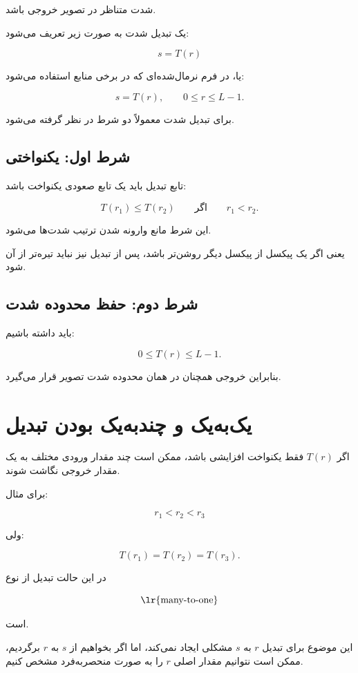 \documentclass[12pt,a4paper]{article}
\begin{document}
	شدت متناظر در تصویر خروجی باشد.
	
	یک تبدیل شدت به صورت زیر تعریف می‌شود:
	
	\[
	s=T(r)
	\]
	
	یا، در فرم نرمال‌شده‌ای که در برخی منابع استفاده می‌شود:
	
	\[
	s=T(r),\qquad 0\le r\le L-1.
	\]
	
	برای تبدیل شدت معمولاً دو شرط در نظر گرفته می‌شود.
	
	\subsection{شرط اول: یکنواختی}
	
	تابع تبدیل باید یک تابع صعودی یکنواخت باشد:
	
	\[
	T(r_1)\le T(r_2)
	\qquad
	\text{اگر}
	\qquad
	r_1<r_2.
	\]
	
	این شرط مانع وارونه شدن ترتیب شدت‌ها می‌شود.
	
	یعنی اگر یک پیکسل از پیکسل دیگر روشن‌تر باشد، پس از تبدیل نیز
	نباید تیره‌تر از آن شود.
	
	\subsection{شرط دوم: حفظ محدوده شدت}
	
	باید داشته باشیم:
	
	\[
	0\le T(r)\le L-1.
	\]
	
	بنابراین خروجی همچنان در همان محدوده شدت تصویر قرار می‌گیرد.
	
	
	\section{یک‌به‌یک و چندبه‌یک بودن تبدیل}
	
	اگر $T(r)$ فقط یکنواخت افزایشی باشد، ممکن است چند مقدار ورودی مختلف
	به یک مقدار خروجی نگاشت شوند.
	
	برای مثال:
	
	\[
	r_1<r_2<r_3
	\]
	
	ولی:
	
	\[
	T(r_1)=T(r_2)=T(r_3).
	\]
	
	در این حالت تبدیل از نوع
	
	\[
	\text{\lr{many-to-one}}
	\]
	
	است.
	
	این موضوع برای تبدیل $r$ به $s$ مشکلی ایجاد نمی‌کند، اما اگر بخواهیم
	از $s$ به $r$ برگردیم، ممکن است نتوانیم مقدار اصلی $r$ را به صورت
	منحصربه‌فرد مشخص کنیم.
	
\end{document}
